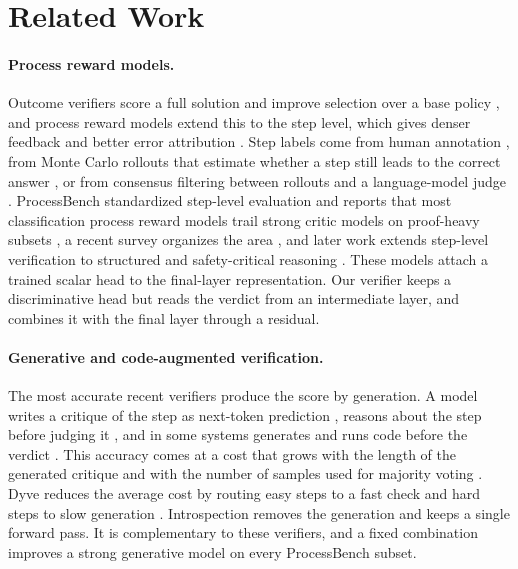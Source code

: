 
\section{Related Work}
\label{sec:related}

\paragraph{Process reward models.}
Outcome verifiers score a full solution and improve selection over a base policy \citep{cobbe2021gsm8k}, and process reward models extend this to the step level, which gives denser feedback and better error attribution \citep{uesato2022solving, lightman2023lets}. Step labels come from human annotation \citep{lightman2023lets}, from Monte Carlo rollouts that estimate whether a step still leads to the correct answer \citep{wang2023mathshepherd}, or from consensus filtering between rollouts and a language-model judge \citep{zhang2025lessons}. ProcessBench standardized step-level evaluation and reports that most classification process reward models trail strong critic models on proof-heavy subsets \citep{zheng2024processbench}, a recent survey organizes the area \citep{zheng2025survey}, and later work extends step-level verification to structured and safety-critical reasoning \citep{pronesti2026verifiable}. These models attach a trained scalar head to the final-layer representation. Our verifier keeps a discriminative head but reads the verdict from an intermediate layer, and combines it with the final layer through a residual.

\paragraph{Generative and code-augmented verification.}
The most accurate recent verifiers produce the score by generation. A model writes a critique of the step as next-token prediction \citep{zhang2024genrm}, reasons about the step before judging it \citep{xiong2025stepwiser}, and in some systems generates and runs code before the verdict \citep{zhao2025genprm}. This accuracy comes at a cost that grows with the length of the generated critique and with the number of samples used for majority voting \citep{snell2024scaling, zhao2025genprm}. Dyve reduces the average cost by routing easy steps to a fast check and hard steps to slow generation \citep{zhong2025dyve}. Introspection removes the generation and keeps a single forward pass. It is complementary to these verifiers, and a fixed combination improves a strong generative model on every ProcessBench subset.

